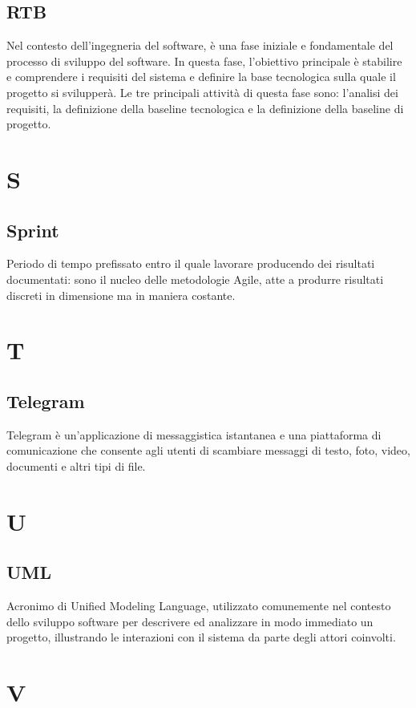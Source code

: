 \documentclass[8pt]{article}
\begin{document}
	\subsection*{RTB}
	Nel contesto dell'ingegneria del software, è una fase iniziale e fondamentale del processo di sviluppo del software. In questa fase, l'obiettivo principale è stabilire e comprendere i requisiti del sistema e definire la base tecnologica sulla quale il progetto si svilupperà. Le tre principali attività di questa fase sono: l'analisi dei requisiti, la definizione della baseline tecnologica e la definizione della baseline di progetto.
	\newpage
	\section*{S}
	\subsection*{Sprint}
	Periodo di tempo prefissato entro il quale lavorare producendo dei risultati documentati: sono il nucleo delle metodologie Agile, atte a produrre risultati discreti in dimensione ma in maniera costante.
	\newpage
	\section*{T}
	\subsection*{Telegram}
	Telegram è un'applicazione di messaggistica istantanea e una piattaforma di comunicazione che consente agli utenti di scambiare messaggi di testo, foto, video, documenti e altri tipi di file.
	\newpage	
	\section*{U}
	\subsection*{UML}
	Acronimo di Unified Modeling Language, utilizzato comunemente nel contesto dello sviluppo software per descrivere ed analizzare in modo immediato un progetto, illustrando le interazioni con il sistema da parte degli attori coinvolti.
	\newpage
	\section*{V}
\end{document}

